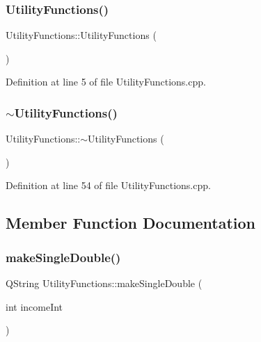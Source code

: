 \subsubsection{\texorpdfstring{Utility\+Functions()}{UtilityFunctions()}}
{\footnotesize\ttfamily Utility\+Functions\+::\+Utility\+Functions (\begin{DoxyParamCaption}{ }\end{DoxyParamCaption})}



Definition at line 5 of file Utility\+Functions.\+cpp.

\hypertarget{classUtilityFunctions_ab92ca1da946cc58713f6d06a4bcd0ff6}{}\label{classUtilityFunctions_ab92ca1da946cc58713f6d06a4bcd0ff6} 
\subsubsection{\texorpdfstring{$\sim$\+Utility\+Functions()}{~UtilityFunctions()}}
{\footnotesize\ttfamily Utility\+Functions\+::$\sim$\+Utility\+Functions (\begin{DoxyParamCaption}{ }\end{DoxyParamCaption})}



Definition at line 54 of file Utility\+Functions.\+cpp.



\subsection{Member Function Documentation}
\hypertarget{classUtilityFunctions_a9decf9e823f96af31a5dac497f2c68d2}{}\label{classUtilityFunctions_a9decf9e823f96af31a5dac497f2c68d2} 
\subsubsection{\texorpdfstring{make\+Single\+Double()}{makeSingleDouble()}}
{\footnotesize\ttfamily Q\+String Utility\+Functions\+::make\+Single\+Double (\begin{DoxyParamCaption}\item[{int}]{income\+Int }\end{DoxyParamCaption})\hspace{0.3cm}{\ttfamily [static]}}



